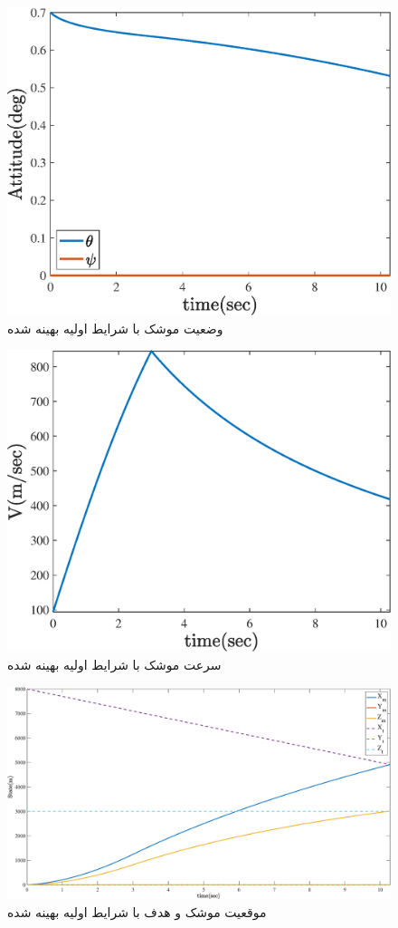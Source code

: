 \begin{figure}[H]
	\centering
	\includegraphics[width=.75\linewidth]{../Figure/b/missle_attitude}
	\caption{وضعیت موشک با شرایط اولیه بهینه شده}
\end{figure}

\begin{figure}[H]
	\centering
	\includegraphics[width=.75\linewidth]{../Figure/b/missle_V}
	\caption{سرعت موشک با شرایط اولیه بهینه شده}
\end{figure}

\begin{figure}[H]
	\centering
	\includegraphics[width=\linewidth]{../Figure/b/missle_vs_target_state}
	\caption{موقعیت موشک و هدف با شرایط اولیه بهینه شده}
\end{figure}

